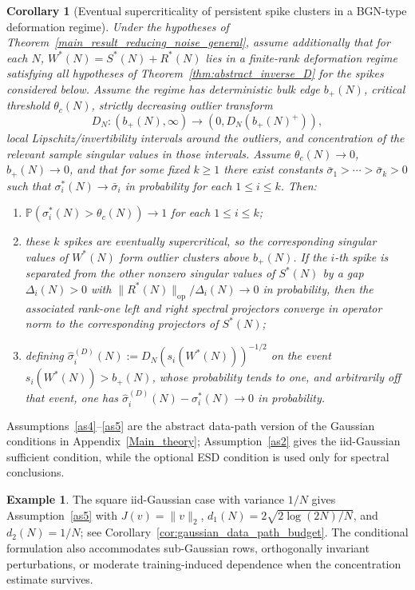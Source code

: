 \documentclass[11pt]{article}
\theoremstyle{plain}
\newtheorem{cor}[thm]{Corollary}
\theoremstyle{definition}
\newtheorem{ex}[thm]{Example}
\theoremstyle{remark}
\newcommand{\PP}{\mathbb{P}}
\newcommand{\op}{\mathrm{op}}
\newcommand{\1}{\mathbf{1}}
\begin{document}
\begin{cor}[Eventual supercriticality of persistent spike clusters in a BGN-type deformation regime]
\label{cor:general_BGN_persistent_spikes}
Under the hypotheses of Theorem~\ref{main_result_reducing_noise_general}, assume additionally that for each \(N\), \(W^*(N)=S^*(N)+R^*(N)\) lies in a finite-rank deformation regime satisfying all hypotheses of Theorem~\ref{thm:abstract_inverse_D} for the spikes considered below. Assume the regime has deterministic bulk edge \(b_+(N)\), critical threshold \(\theta_c(N)\), strictly decreasing outlier transform
\[
D_N:(b_+(N),\infty)\to (0,D_N(b_+(N)^+)),
\]
local Lipschitz/invertibility intervals around the outliers, and concentration of the relevant sample singular values in those intervals. Assume \(\theta_c(N)\to0\), \(b_+(N)\to0\), and that for some fixed \(k\ge1\) there exist constants \(\bar\sigma_1>\cdots>\bar\sigma_k>0\) such that \(\sigma_i^*(N)\to\bar\sigma_i\) in probability for each \(1\le i\le k\). Then:
\begin{enumerate}[leftmargin=2em]
\item \(\PP(\sigma_i^*(N)>\theta_c(N))\to1\) for each \(1\le i\le k\);
\item these \(k\) spikes are eventually supercritical, so the corresponding singular values of \(W^*(N)\) form outlier clusters above \(b_+(N)\). If the \(i\)-th spike is separated from the other nonzero singular values of \(S^*(N)\) by a gap \(\Delta_i(N)>0\) with \(\|R^*(N)\|_{\op}/\Delta_i(N)\to0\) in probability, then the associated rank-one left and right spectral projectors converge in operator norm to the corresponding projectors of \(S^*(N)\);
\item defining \(\widehat\sigma_i^{(D)}(N):=D_N(s_i(W^*(N)))^{-1/2}\) on the event \(s_i(W^*(N))>b_+(N)\), whose probability tends to one, and arbitrarily off that event, one has \(\widehat\sigma_i^{(D)}(N)-\sigma_i^*(N)\to0\) in probability.
\end{enumerate}
\end{cor}

Assumptions~\ref{as4}--\ref{as5} are the abstract data-path version of the Gaussian conditions in Appendix~\ref{Main_theory}; Assumption~\ref{as2} gives the iid-Gaussian sufficient condition, while the optional ESD condition is used only for spectral conclusions.

\begin{ex}
The square iid-Gaussian case with variance \(1/N\) gives Assumption~\ref{as5} with \(J(v)=\|v\|_2\), \(d_1(N)=2\sqrt{2\log(2N)/N}\), and \(d_2(N)=1/N\); see Corollary~\ref{cor:gaussian_data_path_budget}. The conditional formulation also accommodates sub-Gaussian rows, orthogonally invariant perturbations, or moderate training-induced dependence when the concentration estimate survives.
\end{ex}
\end{document}
